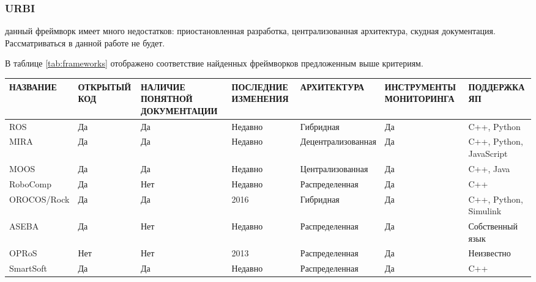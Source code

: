 \subsubsection{URBI} данный фреймворк имеет много недостатков: приостановленная разработка, централизованная архитектура, скудная документация. Рассматриваться в данной работе не будет.

В таблице \ref{tab:frameworks} отображено соответствие найденных фреймворков предложенным выше критериям.

\begin{table*}[h!]
	\scriptsize
	\centering
	\caption{Соответствие найденных робототехнических фреймворков выделенным критериям}
	\label{tab:frameworks}
	\def\arraystretch{1.5}
	\begin{tabular}{lp{2cm}p{2cm}p{2cm}lp{2.7cm}p{2cm}}
		\toprule
		\textbf{НАЗВАНИЕ}     & \textbf{ОТКРЫТЫЙ КОД} & \textbf{НАЛИЧИЕ ПОНЯТНОЙ ДОКУМЕНТАЦИИ} & \textbf{ПОСЛЕДНИЕ ИЗМЕНЕНИЯ} & \textbf{АРХИТЕКТУРА}        & \textbf{ИНСТРУМЕНТЫ МОНИТОРИНГА} & \textbf{ПОДДЕРЖКА ЯП} \\ 
		\midrule 
		ROS          & Да           & Да                            & Недавно             & Гибридная          & Да                      & C++, Python               \\ 
		MIRA         & Да           & Да                            & Недавно             & Децентрализованная & Да                      & C++, Python, JavaScript   \\ 
		MOOS         & Да           & Да                            & Недавно             & Централизованная   & Да                      & C++, Java                 \\ 
		RoboComp     & Да           & Нет                           & Недавно             & Распределенная     & Да                      & C++                       \\ 
		OROCOS/Rock  & Да           & Да                            & 2016                & Гибридная          & Да                      & C++, Python, Simulink     \\ 
		ASEBA        & Да           & Нет                           & Недавно             & Распределенная     & Да                      & Собственный язык          \\ 
		OPRoS        & Нет          & Нет                           & 2013                & Распределенная     & Да                      & Неизвестно                \\ 
		SmartSoft    & Да           & Да                            & Недавно             & Распределенная     & Да                      & C++                       \\ 

\end{tabular}
\end{table*}
